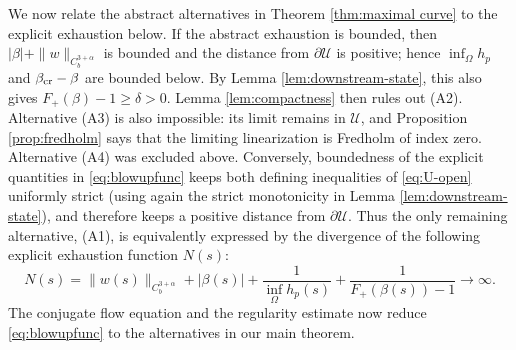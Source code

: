 \documentclass[12pt,letterpaper]{amsart}
\numberwithin{equation}{section}
\begin{document}
{We now relate the abstract alternatives in Theorem \ref{thm:maximal curve} to the explicit exhaustion below. If the abstract exhaustion is bounded, then $|\beta|+\|w\|_{C_b^{3+\alpha}}$ is bounded and the distance from $\partial\mathscr U$ is positive; hence $\inf_\Omega h_p$ and $\beta_{\rm cr}-\beta$ are bounded below. By Lemma \ref{lem:downstream-state}, this also gives $F_+(\beta)-1\geq\delta>0$. Lemma \ref{lem:compactness} then rules out (A2). Alternative (A3) is also impossible: its limit remains in $\mathscr U$, and Proposition \ref{prop:fredholm} says that the limiting linearization is Fredholm of index zero. Alternative (A4) was excluded above. Conversely, boundedness of the explicit quantities in \eqref{eq:blowupfunc} keeps both defining inequalities of \eqref{eq:U-open} uniformly strict (using again the strict monotonicity in Lemma \ref{lem:downstream-state}), and therefore keeps a positive distance from $\partial\mathscr U$. Thus the only remaining alternative, (A1), is equivalently {expressed by the divergence of the following explicit exhaustion function $N(s)$:}}
	\begin{equation}\label{eq:blowupfunc}
	N(s) = \|w(s)\|_{C_b^{3+\alpha}} + |\beta(s)| + \frac{1}{\inf_{\Omega} h_p(s)} + \frac{1}{F_+(\beta(s)) - 1}\to\infty.
	\end{equation}
{The conjugate flow equation and the regularity estimate now reduce \eqref{eq:blowupfunc} to the alternatives in our main theorem.}
\end{document}
